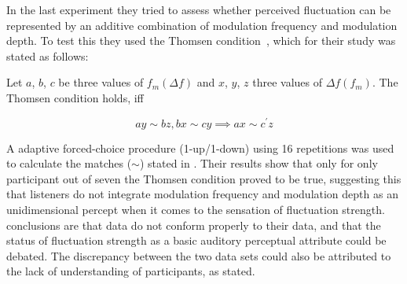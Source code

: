 \documentclass[../main.tex]{subfiles}
\begin{document}
\begin{theoreticalbackground}
In the last experiment they tried to assess whether perceived fluctuation can be
represented by an additive combination of modulation frequency and modulation
depth. To test this they used the Thomsen condition~\cite{Falmagne1976}, which
for their study was stated as follows:

\begin{mdframed}

  Let $a$, $b$, $c$ be three values of $f_m(\Delta f)$ and $x$, $y$, $z$ three
  values of $\Delta f(f_m)$. The Thomsen condition holds, iff

  \begin{equation}
    ay \sim bz, bx \sim cy \implies ax \sim c^{\prime} z
    \label{eq:thomsen}
  \end{equation}

\end{mdframed}

A adaptive forced-choice procedure (1-up/1-down) using 16 repetitions was used to
calculate the matches ($\sim$) stated in . Their results show
that only for only participant out of seven the Thomsen condition proved to be
true, suggesting this  that listeners do not integrate modulation frequency and
modulation depth as an unidimensional percept when it comes to the sensation of
fluctuation strength. \citeauthor{Wickelmaier2004Scaling} conclusions are that
\citeauthor{Fastl2007Psychoacoustics} data do not conform properly to their
data, and that the status of fluctuation strength as a basic auditory perceptual
attribute could be debated. The discrepancy between the two data sets could also
be attributed to the lack of understanding of participants, as
\citeauthor{Accolti2009Fluctuation} stated.

\end{theoreticalbackground}
\end{document}
